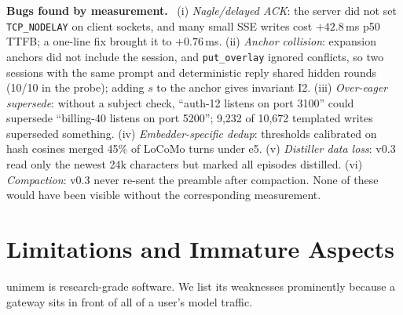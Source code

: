 \documentclass[10pt,twocolumn]{article}
\newcommand{\sys}{\textsf{unimem}}
\newcommand{\code}[1]{\texttt{\small #1}}
\newcommand{\para}[1]{\smallskip\noindent\textbf{#1}\ }
\begin{document}
\para{Bugs found by measurement.} (i) \emph{Nagle/delayed ACK}: the server did not set \code{TCP\_NODELAY} on client
sockets, and many small SSE writes cost $+42.8$\,ms p50 TTFB; a one-line fix brought it to $+0.76$\,ms. (ii) \emph{Anchor
collision}: expansion anchors did not include the session, and \code{put\_overlay} ignored conflicts, so two sessions with
the same prompt and deterministic reply shared hidden rounds (10/10 in the probe); adding $s$ to the anchor gives invariant
I2. (iii) \emph{Over-eager supersede}: without a subject check, ``auth-12 listens on port 3100'' could supersede
``billing-40 listens on port 5200''; 9,232 of 10,672 templated writes superseded something. (iv) \emph{Embedder-specific
dedup}: thresholds calibrated on hash cosines merged 45\% of LoCoMo turns under e5. (v) \emph{Distiller data loss}: v0.3
read only the newest 24k characters but marked all episodes distilled. (vi) \emph{Compaction}: v0.3 never re-sent the preamble
after compaction. None of these would have been visible without the corresponding measurement.

\section{Limitations and Immature Aspects}
\label{sec:limits}

\sys{} is research-grade software. We list its weaknesses prominently because a gateway sits in front of all of a user's
model traffic.
\end{document}
